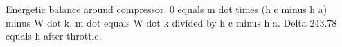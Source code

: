 Energetic balance around compressor. 
0 equals m dot times (h c minus h a) minus W dot k. 
m dot equals W dot k divided by h c minus h a.
Delta 243.78 equals h after throttle.